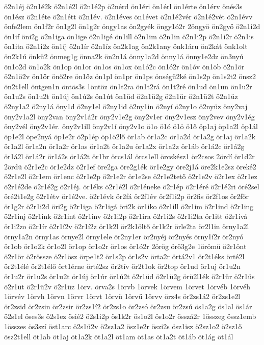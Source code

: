 {ö2n1éj
ö2n1é2k
ö2n1é2l
ö2n1é2p
ö2nérd
ön1éri
ön1érl
ön1érte
ön1érv
önés3s
ön1ész
ö2n1éte
ö2n1étt
ö2n1év.
ö2n1éves
ön1évet
ö2n1é2vér
ö2n1é2vét
ö2n1évv
önfe2lem
ön1f2r
ön1g2l
ön1g2r
öngy1as
ön2gyék
öngy1ó2r
2öngyö
ön2győ
ö2n1i2d
ön1if
öni2g
ö2n1iga
ön1ige
ö2n1igé
ön1ill
ö2n1im
ö2n1in
ö2n1i2p
ö2n1i2r
ö2n1is
ön1ita
ö2n1i2z
ön1íj
ö2n1ír
ö2n1íz
ön2k1ag
ön2k1any
önk1áru
ön2kát
önk1olt
ön2k1ú
önkü2
önmeg1g
önna2k
ön2n1á
önny1a2d
önny1á
önny1e2dz
ön3nyú
ön1o2d
ön1o2k
ön1op
ön1or
ön1os
ön1ox
ön1ó2c
ön1ó2r
ön1óv
ön1öb
ö2n1ör
ö2n1ö2v
ön1őr
önő2re
ön1őz
ön1pl
ön1pr
ön1ps
önségü2ké
ön1s2p
ön1s2t2
önsz2
ön2t1ell
öntgen1n
öntös3s
1öntöz
ön1t2ra
ön1t2rá
ön1t2ré
ön1ud
ön1un
ön1u2r
ön1u2s
ön1u2t
ön1új
ön1ú2s
ön1út
ön1üd
ö2n1ü2g
ö2n1ür
ö2n1ü2t
ö2n1üz
ö2ny1a2
ö2ny1á
öny1d
ö2ny1el
ö2ny1id
ö2ny1in
ö2nyí
ö2ny1o
ö2nyüz
öny2vaj
öny2v1a2l
öny2van
öny2v1á2r
öny2v1e2g
öny2v1er
öny2v1esz
öny2vev
öny2v1ég
öny2vél
öny2v1ér.
öny2v1ill
öny2v1í
öny2v1o
ö1o
ö1ó
ö1ö
ö1ő
öp1aj
öp1a2l
öp1ál
öp1e2l
öpe2nyá
öp1e2r
ö2p1ép
öp1ö2lő
ör1ab
ör1a2c
ör1a2d
ör1a2g
ör1aj
ör1a2k
ör1a2l
ör1a2n
ör1a2r
ör1as
ör1a2t
ör1a2u
ör1a2x
ör1a2z
ör1áb
ör1á2c
ör1á2g
ör1á2l
ör1á2r
ör1á2s
ör1á2t
ör1br
örcs1ál
örcs1ell
örcskész1
ör2csos
2ördí
ör1d2r
2ördü
ö2r1e2c
ör1e2dz
ö2r1ef
öre2ga
öre2g1ék
ör1e2gy
öre2j1á
öre2k1e2sz
öreké2
ö2r1e2l
ö2r1em
ör1enc
ö2r1e2p
ö2r1e2r
ör1e2se
ö2r1e2tető
ö2r1e2v
ö2r1ex
ö2r1ez
ö2r1é2de
ö2r1é2g
ö2r1éj.
ör1éks
ö2r1é2l
ö2r1éneke
ö2r1ép
ö2r1éré
ö2r1é2ri
öré2sel
öré2t1e2g
ö2r1étv
ör1é2ve.
ö2r1évk
ör2fá
ör2f1év
ör2f1i2p
ör2fis
ör2f1os
ör2főr
ör1g2r
ö2r1i2d
öri2g
ö2r1iga
ö2r1igá
öri2k
ör1iko
ö2r1ill
ö2r1im
ö2r1ind
ö2r1ing
ö2r1inj
ö2r1ink
ö2r1int
ö2r1inv
ö2r1i2p
ö2r1ira
ö2r1i2s
ö2r1i2ta
ör1itt
ö2r1ivá
ör1i2zo
ö2r1ír
ö2r1í2v
ö2r1í2z
ör1k2l
ör2k1öltő
ör1k2r
örle2ta
ör2l1in
örny1a2l
örny1a2n
örny1as
örnye2l
örny1ele
ör2ny1er
ör2nyéj
ör2nyés
örny1í2r
ör2nyó
ör1ob
ör1o2k
ör1o2l
ör1op
ör1o2r
ör1os
ör1ó2r
2örög
örö3g2e
1örömü
ö2r1önt
ö2r1ör
ö2rössze
ö2r1ösz
örpe1t2
ör1s2p
ör1s2v
örta2r
örtá2v1
ör2t1éks
örté2l
ör2t1élé
ör2t1élő
ört1érne
örté2sz
ör2tív
ör2t1ok
ör2top
ör1ud
ör1uj
ör1u2n
ör1u2r
ör1u2s
ör1u2t
ör1új
ör1úr
ör1ú2t
ö2r1üd
ö2r1ü2g
örü2l1ék
ö2r1ür
ö2r1üs
ö2r1üt
ö2r1ü2v
ö2r1üz
1örv.
örva2s
1örvb
1örvek
1örvem
1örvet
1örvéb
1örvéh
1örvév
1örvh
1örvn
1örvr
1örvt
1örvü
1örvű
1örvv
örz4s
ör2zs1á2
ör2zs1e2l
ör2zsid
ör2zsin
ör2zsir
ör2zs1í2
ör2zs1o
ör2zsó
ör2zsu
ör2zsú
ös1a2g
ös1al
ös1ár
ö2s1el
öses3s
ö2s1ez
ösié2
ö2s1i2p
ös1k2r
ös1o2l
ös1o2r
összá2r
1összeg
össz1emb
1összes
ös3szí
öst1arc
ö2s1ü2v
ö2sz1a2
ösz1e2r
öszi2s
ösz1isz
ö2sz1o2
ö2sz1ő
ösz2t1ell
öt1ab
öt1aj
öt1a2k
öt1a2l
öt1am
öt1as
öt1a2t
öt1áb
öt1ág
öt1ál
}
